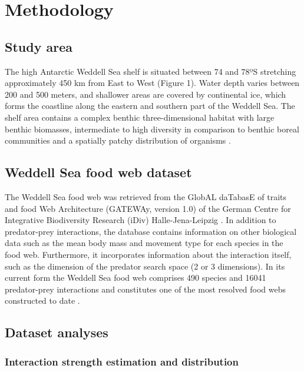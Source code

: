 \documentclass[gc, manuscript]{copernicus}
\begin{document}
\section{Methodology}

\subsection{Study area}

The high Antarctic Weddell Sea shelf is situated between 74 and 78ºS
stretching approximately 450 km from East to West (Figure 1). Water
depth varies between 200 and 500 meters, and shallower areas are covered
by continental ice, which forms the coastline along the eastern and
southern part of the Weddell Sea. The shelf area contains a complex
benthic three-dimensional habitat with large benthic biomasses,
intermediate to high diversity in comparison to benthic boreal
communities and a spatially patchy distribution of organisms
\citep{Dayton1990, Teixido2002}.

\subsection{Weddell Sea food web dataset}

The Weddell Sea food web was retrieved from the GlobAL daTabasE of
traits and food Web Architecture (GATEWAy, version 1.0) of the German
Centre for Integrative Biodiversity Research (iDiv) Halle-Jena-Leipzig
\citep{Brose2018}. In addition to predator-prey interactions, the
database contains information on other biological data such as the mean
body mass and movement type for each species in the food web.
Furthermore, it incorporates information about the interaction itself,
such as the dimension of the predator search space (2 or 3 dimensions).
In its current form the Weddell Sea food web comprises 490 species and
16041 predator-prey interactions and constitutes one of the most
resolved food webs constructed to date \citep{Jacob2011}.

\subsection{Dataset analyses}

\subsubsection{Interaction strength estimation and distribution}
\end{document}
